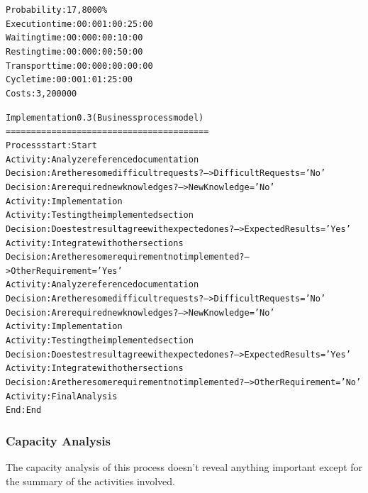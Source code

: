 \begin{alltt}
Probability:   17,8000\%
Execution time:  00:001:00:25:00
Waiting time:  00:000:00:10:00
Resting time:  00:000:00:50:00
Transport time:  00:000:00:00:00
Cycle time:  00:001:01:25:00
Costs:  3,200000

Implementation 0.3 (Business process model)
========================================
Process start: Start
Activity: Analyze reference documentation
Decision: Are there some difficult requests? --> DifficultRequests='No'
Decision: Are required new knowledges? --> NewKnowledge='No'
Activity: Implementation
Activity: Testing the implemented section
Decision: Does test result agree with expected ones? --> ExpectedResults='Yes'
Activity: Integrate with other sections
Decision: Are there some requirement not implemented? --> OtherRequirement='Yes'
Activity: Analyze reference documentation
Decision: Are there some difficult requests? --> DifficultRequests='No'
Decision: Are required new knowledges? --> NewKnowledge='No'
Activity: Implementation
Activity: Testing the implemented section
Decision: Does test result agree with expected ones? --> ExpectedResults='Yes'
Activity: Integrate with other sections
Decision: Are there some requirement not implemented? --> OtherRequirement='No'
Activity: Final Analysis
End: End
\end{alltt}



\subsubsection{Capacity Analysis}
The capacity analysis of this process doesn't reveal anything important except for the summary of the activities involved.

